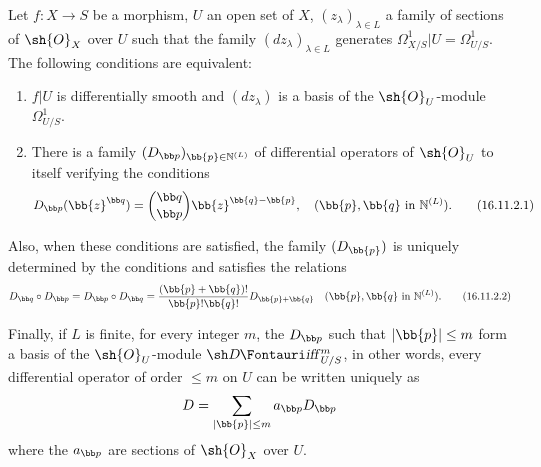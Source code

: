 \begin{theorem}[16.11.2]
\label{IV.16.11.2}
Let $f:X \to S$ be a morphism, $U$ an open set of $X$, $(z_\lambda)_{\lambda \in L}$ a family of sections of $\sh{O}_X$ over $U$ such that the family $(dz_\lambda)_{\lambda \in L}$ generates $\Omega_{X/S}^1|U = \Omega_{U/S}^1$.
The following conditions are equivalent:
\begin{enumerate}
  \item[(a)] $f|U$ is differentially smooth and $(dz_\lambda)$ is a basis of the $\sh{O}_U$-module $\Omega_{U/S}^1$.
  \item[(b)] There is a family $(D_{\bb p})_{\bb{p} \in \mathbb{N}^{(L)}}$ of differential operators of $\sh{O}_U$ to itself verifying the conditions
  \[
    \label{IV.16.11.2.1}
    D_{\bb p} (\bb{z}^{\bb q}) = \binom{\bb q}{\bb p} \bb{z}^{\bb{q} - \bb{p}}, \quad (\bb{p}, \bb{q} \text{ in } \mathbb{N}^{(L)}).
    \tag{16.11.2.1}
  \]
\end{enumerate}

Also, when these conditions are satisfied, the family $(D_\bb{p})$ is uniquely determined by the conditions  and satisfies the relations
\[
  \label{IV.16.11.2.2}
  D_{\bb q} \circ D_{\bb p} = D_{\bb p} \circ D_{\bb q} = \frac{(\bb{p} + \bb{q})!}{\bb{p}!\bb{q}!}D_{\bb{p} + \bb{q}} \quad (\bb{p}, \bb{q} \text{ in }  \mathbb{N}^{(L)}).
  \tag{16.11.2.2}
\]

Finally, if $L$ is finite, for every integer $m$, the $D_{\bb p}$ such that $|\bb{p}| \leq m$ form a basis of the $\sh{O}_U$-module $\shDiff_{U/S}^m$, in other words, every differential operator of order $\leq m$ on $U$ can be written uniquely as
\[
  D = \sum_{|\bb{p}| \leq m} a_{\bb p} D_{\bb p}
\] 
where the $a_{\bb p}$ are sections of $\sh{O}_X$ over $U$.
\end{theorem}

